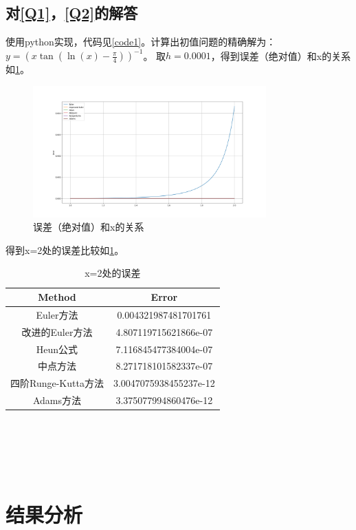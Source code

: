 \documentclass[a4paper,11pt,notitlepage]{article}
\begin{document}
\subsection{对\ref{Q1}，\ref{Q2}的解答}
使用python实现，代码见\cref{code1}。计算出初值问题的精确解为：$y=(x \tan(\ln(x)-\frac{\pi}{4}))^{-1}$。
取$h=0.0001$，得到误差（绝对值）和x的关系如\cref{pic:1}。
\begin{figure}[H]
    \centering
    \includegraphics[width=0.8\textwidth]{../picture/Tenth_Chapter.png}
    \caption{误差（绝对值）和x的关系}
    \label{pic:1}
\end{figure}
得到x=2处的误差比较如\cref{tab:1}。
\begin{table}[ht]
    \begin{center}
    \begin{tabular}{|c|c|}
        \hline
        Method & Error \\
        \hline
        Euler方法 & 0.004321987481701761 \\
        \hline
        改进的Euler方法 & 4.807119715621866e-07 \\
        \hline
        Heun公式 & 7.116845477384004e-07 \\
        \hline
        中点方法 & 8.271718101582337e-07 \\
        \hline
        四阶Runge-Kutta方法 & 3.0047075938455237e-12\\
        \hline
        Adams方法&3.375077994860476e-12\\
        \hline
        \end{tabular}
        \caption{x=2处的误差}
        \label{tab:1}
    \end{center}
\end{table}
\\
\\
\\
\\
\section{结果分析}
\end{document}
